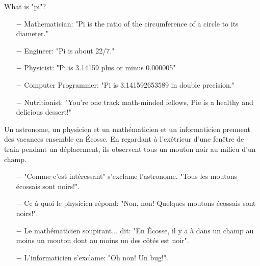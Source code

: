 	\begin{center}\underline{\hspace{5 cm}}\end{center}
	
What is "pi"?

\begin{itemize}	 
	\item[$-$] Mathematician: "Pi is the ratio of the circumference of a circle to its diameter."

	\item[$-$] Engineer: "Pi is about 22/7."

	\item[$-$] Physicist: "Pi is 3.14159 plus or minus 0.000005"

	\item[$-$] Computer Programmer: "Pi is 3.141592653589 in double precision."

	\item[$-$] Nutritionist: "You're one track math-minded fellows, Pie is a healthy and delicious dessert!"
\end{itemize}

	\begin{center}\underline{\hspace{5 cm}}\end{center}
	
Un astronome, un physicien et un mathématicien et un informaticien prennent des vacances ensemble en Écosse. En regardant à l'exétrieur d'une fenêtre de train pendant un déplacement, ils observent tous un mouton noir au milieu d'un champ.

\begin{itemize}	 
	\item[$-$] "Comme c'est intéressant" s'exclame l'astronome. "Tous les moutons écossais sont noirs!". 

	\item[$-$] Ce à quoi le physicien répond: "Non, non! Quelques moutons écossais sont noirs!". 

	\item[$-$] Le mathématicien soupirant... dit: "En Écosse, il y a à dans un champ au moins un mouton dont au moins un des côtés est noir".

	\item[$-$] L'informaticien s'exclame: "Oh non! Un bug!".	
\end{itemize}

	\begin{center}\underline{\hspace{5 cm}}\end{center}	
	
